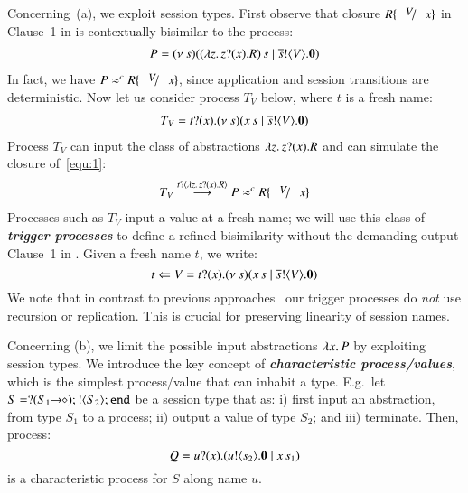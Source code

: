 Concerning~(a), we exploit session types. 
First observe that closure $R\subst{V}{x}$ 
in Clause~1 in 
is contextually bisimilar to the process:
%
\begin{eqnarray}
	\label{equ:1}
	P = (\nu\ s)((\lambda z.\,z ? (x) .{R})\,s \;|\; \overline{s} ! \langle V \rangle . \mathbf{0})
\end{eqnarray}
%
\noi
In fact, we have $P \wbc R\subst{V}{x}$, since 
application and session transitions are deterministic.  
Now let us consider process $T_{V}$ below,
where $t$ is a fresh name:
%
\begin{eqnarray}
	\label{equ:0}
	T_{V} = t ? (x) . (\nu\ s)(x\,s \;|\; \overline{s} ! \langle V \rangle . \mathbf{0})
\end{eqnarray}
%
\noi
Process $T_{V}$ can input the class of
abstractions $\lambda z.\,z ? (x) . R$ and
can simulate the closure of~\ref{equ:1}:%
%
\begin{eqnarray}
	\label{equ:2}
	T_{V} \by{\bactinp{t}{\abs{z}{\binp{z}{x}R}}} P \wbc R \subst{V}{x}
\end{eqnarray}
Processes such as $T_{V}$
input a value at a fresh name;
we will use this class of 
{\bf\em trigger processes} to define a
refined bisimilarity without the demanding 
output Clause~1 in .
Given a fresh name $t$, we write:
%
\[
	t \Leftarrow V = t ? (x) . (\nu\ s)(x\,s \;|\; \overline{s} ! \langle V \rangle . \mathbf{0})
\]
%
We note that in contrast to previous
approaches~\cite{SaWabook,JeffreyR05} 
our {trigger processes} do {\em not}
use recursion or replication.
This is crucial for preserving linearity of 
session names.



Concerning (b), we limit the possible input abstractions
$\lambda x.\,P$ by exploiting session types.
We introduce the key concept of {\bf \emph{characteristic process/values}},
which is the 
simplest process/value that can inhabit a type.
E.g.~let $S = ? (S_1\!\! \rightarrow\!\! \diamond) ; ! \langle S_2 \rangle ; \mathtt{end}$
be a session type that as:
i) first input an abstraction, from type $S_1$ to a process;
ii) output a value of type $S_2$; and iii) terminate.
Then, process:
%
\[
	Q = u ? (x) . (u ! \langle s_2 \rangle . \mathbf{0} \;|\; x\,s_1)
\]
%
\noi is a characteristic process for $S$ along name $u$.
 
